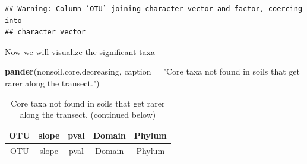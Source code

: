 \documentclass[]{article}
\newenvironment{Shaded}{\begin{snugshade}}{\end{snugshade}}
\newcommand{\KeywordTok}[1]{\textcolor[rgb]{0.13,0.29,0.53}{\textbf{#1}}}
\newcommand{\DataTypeTok}[1]{\textcolor[rgb]{0.13,0.29,0.53}{#1}}
\newcommand{\StringTok}[1]{\textcolor[rgb]{0.31,0.60,0.02}{#1}}
\newcommand{\NormalTok}[1]{#1}
\begin{document}
\begin{verbatim}
## Warning: Column `OTU` joining character vector and factor, coercing into
## character vector
\end{verbatim}

Now we will visualize the significant taxa

\begin{Shaded}
\begin{Highlighting}[]
\KeywordTok{pander}\NormalTok{(nonsoil.core.decreasing, }\DataTypeTok{caption =} \StringTok{"Core taxa not found in soils that get rarer along the transect."}\NormalTok{)}
\end{Highlighting}
\end{Shaded}

\begin{longtable}[]{@{}ccccc@{}}
\caption{Core taxa not found in soils that get rarer along the transect.
(continued below)}\tabularnewline
\toprule
\begin{minipage}[b]{0.13\columnwidth}\centering\strut
OTU\strut
\end{minipage} & \begin{minipage}[b]{0.14\columnwidth}\centering\strut
slope\strut
\end{minipage} & \begin{minipage}[b]{0.12\columnwidth}\centering\strut
pval\strut
\end{minipage} & \begin{minipage}[b]{0.13\columnwidth}\centering\strut
Domain\strut
\end{minipage} & \begin{minipage}[b]{0.19\columnwidth}\centering\strut
Phylum\strut
\end{minipage}\tabularnewline
\midrule
\endfirsthead
\toprule
\begin{minipage}[b]{0.13\columnwidth}\centering\strut
OTU\strut
\end{minipage} & \begin{minipage}[b]{0.14\columnwidth}\centering\strut
slope\strut
\end{minipage} & \begin{minipage}[b]{0.12\columnwidth}\centering\strut
pval\strut
\end{minipage} & \begin{minipage}[b]{0.13\columnwidth}\centering\strut
Domain\strut
\end{minipage} & \begin{minipage}[b]{0.19\columnwidth}\centering\strut
Phylum\strut
\end{minipage}\tabularnewline

\end{longtable}
\end{document}
